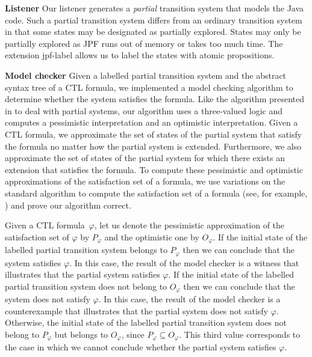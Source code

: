 \documentclass[twocolumn]{article}
\begin{document}
\textbf{Listener}  Our listener generates a \emph{partial} transition system that models the Java code.  Such a partial transition system differs from an ordinary transition system in that some states may be designated as partially explored.  States may only be partially explored as JPF runs out of memory or takes too much time.  The extension jpf-label \cite{F20} allows us to label the states with atomic propositions.

\textbf{Model checker}  Given a labelled partial transition system and the abstract syntax tree of a CTL formula, we implemented a model checking algorithm to determine whether the system satisfies the formula.  Like the algorithm presented in \cite{BG99} to deal with partial systems, our algorithm uses a three-valued logic and computes a pessimistic interpretation and an optimistic interpretation.  Given a CTL formula, we approximate the set of states of the partial system that satisfy the formula no matter how the partial system is extended.  Furthermore, we also approximate the set of states of the partial system for which there exists an extension that satisfies the formula.  To compute these pessimistic and optimistic approximations of the satisfaction set of a formula, we use variations on the standard algorithm to compute the satisfaction set of a formula (see, for example, \cite[Section~6.4]{BK08}) and prove our algorithm correct.  

Given a CTL formula~$\varphi$, let us denote the pessimistic approximation of the satisfaction set of $\varphi$ by $P_{\varphi}$ and the optimistic one by $O_{\varphi}$.  If the initial state of the labelled partial transition system belongs to $P_{\varphi}$ then we can conclude that the system satisfies $\varphi$.  In this case, the result of the model checker is a witness that illustrates that the partial system satisfies $\varphi$.  If the initial state of the labelled partial transition system does not belong to $O_{\varphi}$ then we can conclude that the system does not satisfy  $\varphi$.  In this case, the result of the model checker is a counterexample that illustrates that the partial system does not satisfy $\varphi$.  Otherwise, the initial state of the labelled partial transition system does not belong to $P_{\varphi}$ but belongs to $O_{\varphi}$, since $P_{\varphi} \subseteq O_{\varphi}$.  This third value corresponds to the case in which we cannot conclude whether the partial system satisfies $\varphi$.

\newpage



\end{document}
